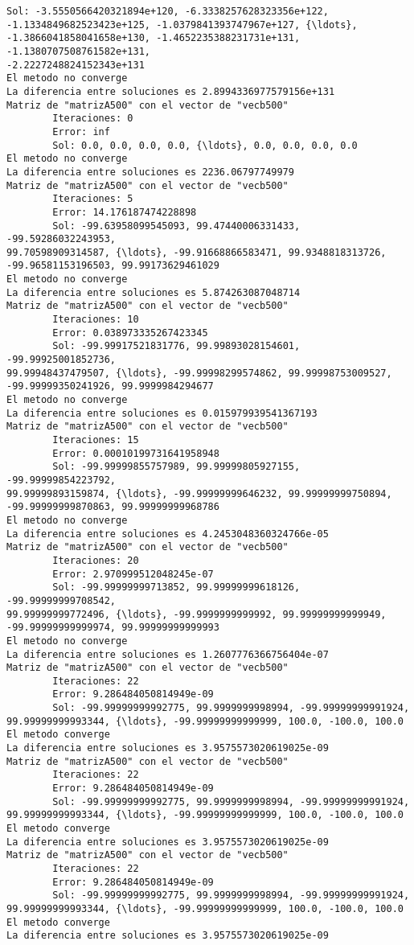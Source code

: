 \documentclass[11pt]{article}
\begin{document}
\begin{Verbatim}[commandchars=\\\{\}]
        Sol: -3.5550566420321894e+120, -6.3338257628323356e+122,
-1.1334849682523423e+125, -1.0379841393747967e+127, {\ldots},
-1.3866041858041658e+130, -1.4652235388231731e+131, -1.1380707508761582e+131,
-2.2227248824152343e+131
El metodo no converge
La diferencia entre soluciones es 2.8994336977579156e+131
Matriz de "matrizA500" con el vector de "vecb500"
        Iteraciones: 0
        Error: inf
        Sol: 0.0, 0.0, 0.0, 0.0, {\ldots}, 0.0, 0.0, 0.0, 0.0
El metodo no converge
La diferencia entre soluciones es 2236.06797749979
Matriz de "matrizA500" con el vector de "vecb500"
        Iteraciones: 5
        Error: 14.176187474228898
        Sol: -99.63958099545093, 99.47440006331433, -99.59286032243953,
99.70598909314587, {\ldots}, -99.91668866583471, 99.9348818313726,
-99.96581153196503, 99.99173629461029
El metodo no converge
La diferencia entre soluciones es 5.874263087048714
Matriz de "matrizA500" con el vector de "vecb500"
        Iteraciones: 10
        Error: 0.038973335267423345
        Sol: -99.99917521831776, 99.99893028154601, -99.99925001852736,
99.99948437479507, {\ldots}, -99.99998299574862, 99.99998753009527,
-99.99999350241926, 99.9999984294677
El metodo no converge
La diferencia entre soluciones es 0.015979939541367193
Matriz de "matrizA500" con el vector de "vecb500"
        Iteraciones: 15
        Error: 0.00010199731641958948
        Sol: -99.99999855757989, 99.99999805927155, -99.99999854223792,
99.99999893159874, {\ldots}, -99.99999999646232, 99.99999999750894,
-99.99999999870863, 99.99999999968786
El metodo no converge
La diferencia entre soluciones es 4.2453048360324766e-05
Matriz de "matrizA500" con el vector de "vecb500"
        Iteraciones: 20
        Error: 2.970999512048245e-07
        Sol: -99.99999999713852, 99.99999999618126, -99.99999999708542,
99.99999999772496, {\ldots}, -99.9999999999992, 99.99999999999949,
-99.99999999999974, 99.99999999999993
El metodo no converge
La diferencia entre soluciones es 1.2607776366756404e-07
Matriz de "matrizA500" con el vector de "vecb500"
        Iteraciones: 22
        Error: 9.286484050814949e-09
        Sol: -99.99999999992775, 99.9999999998994, -99.99999999991924,
99.99999999993344, {\ldots}, -99.99999999999999, 100.0, -100.0, 100.0
El metodo converge
La diferencia entre soluciones es 3.9575573020619025e-09
Matriz de "matrizA500" con el vector de "vecb500"
        Iteraciones: 22
        Error: 9.286484050814949e-09
        Sol: -99.99999999992775, 99.9999999998994, -99.99999999991924,
99.99999999993344, {\ldots}, -99.99999999999999, 100.0, -100.0, 100.0
El metodo converge
La diferencia entre soluciones es 3.9575573020619025e-09
Matriz de "matrizA500" con el vector de "vecb500"
        Iteraciones: 22
        Error: 9.286484050814949e-09
        Sol: -99.99999999992775, 99.9999999998994, -99.99999999991924,
99.99999999993344, {\ldots}, -99.99999999999999, 100.0, -100.0, 100.0
El metodo converge
La diferencia entre soluciones es 3.9575573020619025e-09
    \end{Verbatim}
\end{document}
